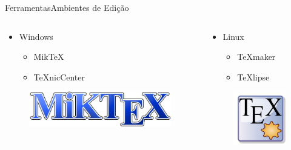 \documentclass[hyperref={pdfpagelabels=false}]{beamer}
\begin{document}
\begin{frame}{Ferramentas}{Ambientes de Edição}
    \begin{columns}[t]
        \begin{column}{0.5\textwidth}
            \begin{itemize}
                \item Windows
                \begin{itemize}
                    \item Mik\TeX{}
                    \item \TeX{}nicCenter
                \end{itemize}
            \end{itemize}
            \begin{figure}
                \centering{}
                \includegraphics[scale=0.4]{images/miktex}
            \end{figure}
        \end{column}
        \begin{column}{0.5\textwidth}
            \begin{itemize}
                \item Linux
                \begin{itemize}
                    \item \TeX{}maker
                    \item \TeX{}lipse
                \end{itemize}
            \end{itemize}
            \begin{figure}
                \centering{}
                \includegraphics[scale=0.4]{images/texmaker}
            \end{figure}
        \end{column}
    \end{columns}
\end{frame}
\end{document}
